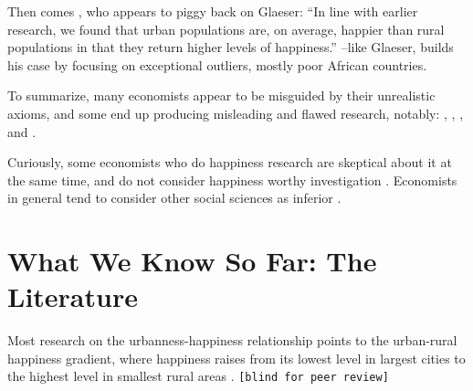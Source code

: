 \documentclass[10pt, letterpaper]{article}
\begin{document}

Then comes \citep{burger20}, who appears to piggy back on Glaeser: ``In line with earlier research, we found that
urban populations are, on average, happier than rural populations in that they
return higher levels of happiness.''%
--like Glaeser, \citet{burger20} builds his case by focusing on exceptional outliers,
mostly poor African countries. 

To summarize, many economists appear to be misguided by their unrealistic
axioms, and some end up producing misleading and flawed research, notably:
\citet{stevenson13}, \citet{glaeser11}, \citet{glaeser14}, and \citet{burger20}.




Curiously, some economists who do happiness research are skeptical about it at
the same time, and do not consider happiness worthy investigation
\citep[e.g.,][]{deaton13c,glaeser14B,glaeser14}.
 Economists in general tend to consider other
 social sciences as inferior \citep{economist16jan6,economist_dec6_14,naimATL15apr14, fourcade15}.


\section{What We Know So Far: The Literature}

Most research on the urbanness-happiness relationship points to the urban-rural
happiness gradient, where happiness raises from its lowest level in largest
cities to the highest level in smallest rural areas
\citep[e.g.,][]{campbell76etal,aok11a, ons11, morrison11,
  aok_brfss_city_cize16,senior_ny_sep16_14,ibt13,
  morrison15,lenzi16D,aok20}. \texttt{[blind for peer review]} %
\end{document}
